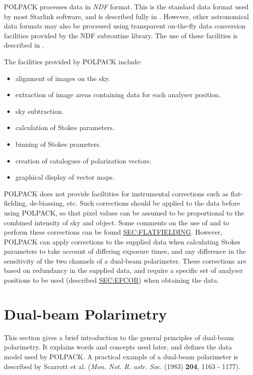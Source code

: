 POLPACK processes data in {\em NDF} format. This is the standard data
format used by most Starlink software, and is described fully in
. However, other astronomical data formats may also
be processed using transparent on-the-fly data conversion facilities
provided by the NDF subroutine library. The use of these facilities is
described in .

The facilities provided by POLPACK include:

\begin{itemize}
\item alignment of images on the sky.
\item extraction of image areas containing data for each analyser position.
\item sky subtraction.
\item calculation of Stokes parameters.
\item binning of Stokes prameters.
\item creation of catalogues of polarization vectors.
\item graphical display of vector maps.
\end{itemize}

POLPACK does not provide faciltities for instrumental corrections such as
flat-fielding, de-biassing, etc. Such corrections should be applied to the 
data before using POLPACK, so that pixel values can be assumed to be
proportional to the combined intensity of sky and object. Some comments
on the use of  and  to
perform these corrections can be found \hyperref{here}{in
section}{}{SEC:FLATFIELDING}. However, POLPACK can apply corrections to the
supplied data when calculating Stokes parameters to take account of differing 
exposure times, and any difference in the sensitivity of the two channels of 
a dual-beam polarimeter. These corrections are based on redundancy in the
supplied data, and require a specific set of analyser positions to be
used (described \hyperref{here}{in section}{}{SEC:EFCOR}) when obtaining the 
data.

\section{Dual-beam Polarimetry}
This section gives a brief introduction to the general principles of
dual-beam polarimetry. It explains words and concepts used later, and
defines the data model used by POLPACK. A practical example of a dual-beam 
polarimeter is described by Scarrott et al. ({\em Mon. Not. R. astr. Soc.} 
(1983) {\bf 204}, 1163 - 1177).

